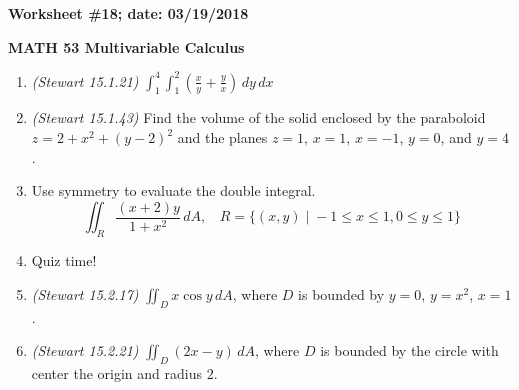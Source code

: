 \documentclass{article}
\begin{document}
{\bf Worksheet \#18; date: 03/19/2018}

{\bf MATH 53 Multivariable Calculus}

\begin{enumerate}
\item {\em (Stewart 15.1.21)} $\displaystyle \int_1^4 \int_1^2 \left(\frac{x}{y} + \frac{y}{x}\right) \,dy \,dx$

\item {\em (Stewart 15.1.43)} Find the volume of the solid enclosed by the paraboloid $z = 2 + x^2 + (y - 2)^2$ and the planes $z = 1$, $x = 1$, $x = -1$, $y = 0$, and $y = 4$.

\item Use symmetry to evaluate the double integral.
\[
\iint_R \frac{(x + 2)y}{1 + x^2} \,dA, ~~~~ R = \{(x, y) \;|\; -1 \le x \le 1, 0 \le y \le 1\}
\]

\item Quiz time!

\item {\em (Stewart 15.2.17)} $\displaystyle \iint_D x \cos y \,dA$, where $D$ is bounded by $y = 0$, $y = x^2$, $x = 1$.

\item {\em (Stewart 15.2.21)} $\displaystyle \iint_D (2x - y) \,dA$, where $D$ is bounded by the circle with center the origin and radius $2$.
\end{enumerate}
\end{document}

